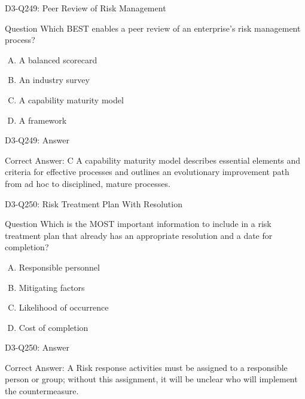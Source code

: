 \documentclass{beamer}
\begin{document}
	\begin{frame}{D3-Q249: Peer Review of Risk Management}
		\begin{block}{Question}
			Which BEST enables a peer review of an enterprise's risk management process?
		\end{block}
		\begin{enumerate}[(A)]
			\item A balanced scorecard
			\item An industry survey
			\item A capability maturity model
			\item A framework
		\end{enumerate}
	\end{frame}
	\begin{frame}{D3-Q249: Answer}
		\begin{block}{Correct Answer: C}
			A capability maturity model describes essential elements and criteria for effective processes and outlines an evolutionary improvement path from ad hoc to disciplined, mature processes.
		\end{block}
	\end{frame}
	
	\begin{frame}{D3-Q250: Risk Treatment Plan With Resolution}
		\begin{block}{Question}
			Which is the MOST important information to include in a risk treatment plan that already has an appropriate resolution and a date for completion?
		\end{block}
		\begin{enumerate}[(A)]
			\item Responsible personnel
			\item Mitigating factors
			\item Likelihood of occurrence
			\item Cost of completion
		\end{enumerate}
	\end{frame}
	\begin{frame}{D3-Q250: Answer}
		\begin{block}{Correct Answer: A}
			Risk response activities must be assigned to a responsible person or group; without this assignment, it will be unclear who will implement the countermeasure.
		\end{block}
	\end{frame}
	
\end{document}

